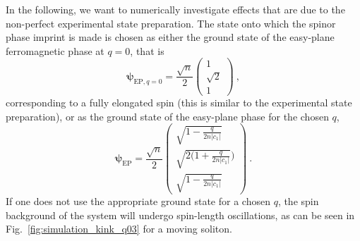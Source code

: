 \documentclass[aps,

               pra,
               twocolumn,
               amsmath,
               amssymb,
               superscriptaddress,
               reprint,
               10pt
              ]{revtex4-2}
\begin{document}
\begin{appendix}
\begin{equation}
    \label{eq:Spins}
\end{equation}
In the following, we want to numerically investigate effects that are due to the non-perfect experimental state preparation.
The state onto which the spinor phase imprint is made is chosen as either the ground state of the easy-plane ferromagnetic phase at $q=0$, that is
\begin{equation}
    \boldsymbol{\psi}_{\mathrm{EP}, q=0} = \frac{\sqrt{n}}{2}\begin{pmatrix}
        1 \\
        \sqrt{2} \\
        1
    \end{pmatrix} \:,
\end{equation}
corresponding to a fully elongated spin (this is similar to the experimental state preparation), or as the ground state of the easy-plane phase for the chosen $q$,
\begin{equation}
    \boldsymbol{\psi}_\mathrm{EP} = \frac{\sqrt{n}}{2}\begin{pmatrix}
        \sqrt{1-\frac{q}{2n|c_1|}}\\
         \sqrt{2(1+\frac{q}{2n|c_1|}}) \\
        \sqrt{1-\frac{q}{2n|c_1|}}
    \end{pmatrix} \:.
\end{equation}
If one does not use the appropriate ground state for a chosen $q$, the spin background of the system will undergo spin-length oscillations, as can be seen in Fig.~\ref{fig:simulation_kink_q03} for a moving soliton.


\end{appendix}
\end{document}
